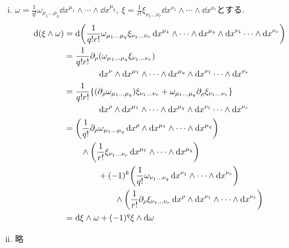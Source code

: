 \documentclass[../main.tex]{subfiles}
\begin{document}
    \begin{prf}{}{}
        \begin{enumerate}[(i)]
            \item $\displaystyle
                    \omega = \frac{1}{q!}\omega_{\mu_1\ldots\mu_q}
                            \dd{x}^{\mu_1} \wedge \cdots \wedge \dd{x}^{\mu_q},\
                    \xi = \frac{1}{r!}\xi_{\nu_1\ldots\nu_r}
                            \dd{x}^{\nu_1} \wedge \cdots \wedge \dd{x}^{\nu_r}
                    $とする.
                \begin{align*}
                    \dd(\xi \wedge \omega)
                    &= \dd(\frac{1}{q!r!}
                        \omega_{\mu_1\ldots\mu_q}\xi_{\nu_1\ldots\nu_r}
                            \dd{x}^{\mu_1} \wedge \cdots \wedge
                                \dd{x}^{\mu_q} \wedge \dd{x}^{\nu_1}
                                    \cdots \wedge \dd{x}^{\nu_{r}}) \\
                    &= \frac{1}{q!r!}\partial_\rho(\omega_{\mu_1\ldots\mu_q}
                            \xi_{\nu_1\ldots\nu_r}) \\
                    &\qquad\qquad \dd{x}^\nu \wedge \dd{x}^{\mu_1}
                        \wedge \cdots \wedge \dd{x}^{\mu_q} \wedge
                            \dd{x}^{\nu_1} \cdots \wedge \dd{x}^{\nu_{r}} \\
                    &= \frac{1}{q!r!} \{
                        (\partial_\rho\omega_{\mu_1\ldots\mu_q})
                            \xi_{\nu_1\ldots\nu_r}
                                + \omega_{\mu_1\ldots\mu_q}\partial_\rho
                                    \xi_{\nu_1\ldots\nu_r}\} \\
                    &\qquad\qquad \dd{x}^\rho \wedge \dd{x}^{\mu_1}
                        \wedge \cdots \wedge \dd{x}^{\mu_q} \wedge
                            \dd{x}^{\nu_1} \cdots \wedge \dd{x}^{\nu_{r}} \\
                    &= \qty(\frac{1}{q!} \partial_\rho \omega_{\mu_1\ldots\mu_q}
                        \dd{x}^\rho \wedge \dd{x}^{\mu_1} \wedge
                            \cdots \wedge \dd{x}^{\mu_q}) \\
                    &\qquad \wedge\qty(\frac{1}{r!} \xi_{\nu_1\ldots\nu_r}
                        \dd{x}^{\mu_1} \wedge \cdots \wedge \dd{x}^{\mu_q}) \\
                    &\qquad\qquad + (-1)^k \qty(\frac{1}{q!}
                        \omega_{\nu_1\ldots\nu_q} \dd{x}^{\nu_1} \wedge
                            \cdots \wedge \dd{x}^{\nu_r}) \\
                    &\qquad\qquad\qquad \wedge \qty(\frac{1}{r!}
                        \partial_\rho \xi_{\nu_1\ldots\nu_r} \dd{x}^\rho
                            \wedge \dd{x}^{\nu_1} \wedge
                                \cdots \wedge \dd{x}^{\nu_r}) \\
                    &= \dd{\xi}\wedge\omega + (-1)^{q}\xi\wedge\dd{\omega}
                \end{align*}
            \item 略
        \end{enumerate}
    \end{prf}
\end{document}
